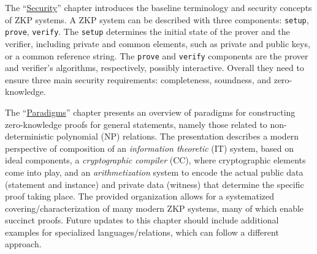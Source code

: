 \label{par:exec-summ:chap-security}
The ``\hyperref[chap:security]{Security}'' chapter introduces the baseline terminology and security concepts of ZKP systems.
A ZKP system can be described with three components: {\tt setup}, {\tt prove}, {\tt verify}. 
The {\tt setup} determines the initial state of the prover and the verifier, including private and common elements, such as private and public keys, or a common reference string.
The {\tt prove} and {\tt verify} components are the prover and verifier's algorithms, respectively, possibly interactive.
Overall they need to ensure three main security requirements: completeness, soundness, and zero-knowledge.



The ``\hyperref[chap:paradigms]{Paradigms}'' chapter presents an overview of paradigms for constructing zero-knowledge proofs for general statements, namely those related to non-deterministic polynomial (NP) relations.
The presentation describes a modern perspective of composition of an \emph{information theoretic} (IT) system, based on ideal components, a \emph{cryptographic compiler} (CC), where cryptographic elements come into play, and an \emph{arithmetization} system to encode the actual public data (statement and instance) and private data (witness) that determine the specific proof taking place.
The provided organization allows for a systematized covering/characterization of many modern ZKP systems, many of which enable succinct proofs.
Future updates to this chapter should include additional examples for specialized languages/relations, which can follow  a different approach.


